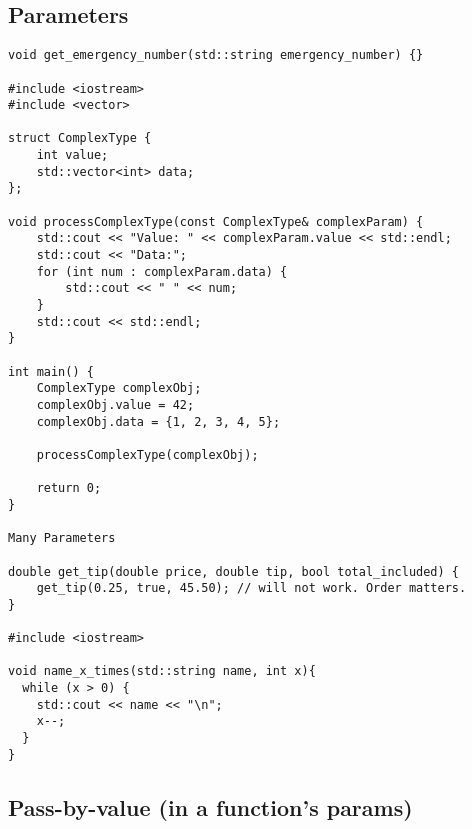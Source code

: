 \documentclass[openany]{report}
\begin{document}
\subsection{Parameters}

\begin{verbatim}
void get_emergency_number(std::string emergency_number) {}

#include <iostream>
#include <vector>

struct ComplexType {
    int value;
    std::vector<int> data;
};

void processComplexType(const ComplexType& complexParam) {
    std::cout << "Value: " << complexParam.value << std::endl;
    std::cout << "Data:";
    for (int num : complexParam.data) {
        std::cout << " " << num;
    }
    std::cout << std::endl;
}

int main() {
    ComplexType complexObj;
    complexObj.value = 42;
    complexObj.data = {1, 2, 3, 4, 5};

    processComplexType(complexObj);

    return 0;
}

Many Parameters

double get_tip(double price, double tip, bool total_included) {
    get_tip(0.25, true, 45.50); // will not work. Order matters. 
}

#include <iostream>

void name_x_times(std::string name, int x){
  while (x > 0) {
    std::cout << name << "\n";
    x--;
  }
}
\end{verbatim}

\subsection{Pass-by-value (in a function's params)}
\end{document}

